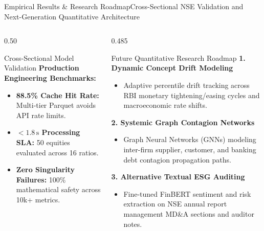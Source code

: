 \begin{frame}{Empirical Results \& Research Roadmap}{Cross-Sectional NSE Validation and Next-Generation Quantitative Architecture}
\begin{columns}[T,onlytextwidth]
\begin{column}{0.50\textwidth}
\begin{quantcard}[height=5.60cm]{Cross-Sectional Model Validation}
                \vspace{2pt}
                \textbf{\color{deepemerald}Production Engineering Benchmarks:}
                \begin{itemize}
                    \setlength{\itemsep}{0.2pt}
                    \item \textbf{88.5\% Cache Hit Rate:} Multi-tier Parquet avoids API rate limits.
                    \item \textbf{$< 1.8\,\text{s}$ Processing SLA:} 50 equities evaluated across 16 ratios.
                    \item \textbf{Zero Singularity Failures:} 100\% mathematical safety across 10k+ metrics.
                \end{itemize}
                \vspace{3pt}
            \end{quantcard}
        \end{column}

        \begin{column}{0.485\textwidth}
            \begin{quantcard}[height=5.60cm]{Future Quantitative Research Roadmap}
                \fontsize{5.3pt}{6.6pt}\selectfont
                \textbf{\color{deepemerald}1. Dynamic Concept Drift Modeling}
                \begin{itemize}
                    \setlength{\itemsep}{0.3pt}
                    \item Adaptive percentile drift tracking across RBI monetary tightening/easing cycles and macroeconomic rate shifts.
                \end{itemize}

                \vspace{2pt}
                \textbf{\color{deepemerald}2. Systemic Graph Contagion Networks}
                \begin{itemize}
                    \setlength{\itemsep}{0.3pt}
                    \item Graph Neural Networks (GNNs) modeling inter-firm supplier, customer, and banking debt contagion propagation paths.
                \end{itemize}

                \vspace{2pt}
                \textbf{\color{deepemerald}3. Alternative Textual ESG Auditing}
                \begin{itemize}
                    \setlength{\itemsep}{0.3pt}
                    \item Fine-tuned FinBERT sentiment and risk extraction on NSE annual report management MD\&A sections and auditor notes.
                \end{itemize}


\end{quantcard}
\end{column}
\end{columns}
\end{frame}

